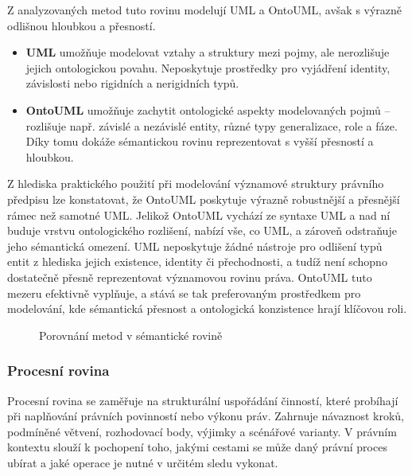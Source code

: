 Z analyzovaných metod tuto rovinu modelují UML a OntoUML, avšak s výrazně odlišnou hloubkou a přesností.

\begin{itemize}
  \item \textbf{UML} umožňuje modelovat vztahy a struktury mezi pojmy, ale nerozlišuje jejich ontologickou povahu. Neposkytuje prostředky pro vyjádření identity, závislosti nebo rigidních a nerigidních typů.

  \item \textbf{OntoUML} umožňuje zachytit ontologické aspekty modelovaných pojmů – rozlišuje např. závislé a nezávislé entity, různé typy generalizace, role a fáze. Díky tomu dokáže sémantickou rovinu reprezentovat s vyšší přesností a hloubkou.
\end{itemize}

\noindent Z hlediska praktického použití při modelování významové struktury právního předpisu lze konstatovat, že OntoUML poskytuje výrazně robustnější a přesnější rámec než samotné UML. Jelikož OntoUML vychází ze syntaxe UML a nad ní buduje vrstvu ontologického rozlišení, nabízí vše, co UML, a zároveň odstraňuje jeho sémantická omezení. UML neposkytuje žádné nástroje pro odlišení typů entit z hlediska jejich existence, identity či přechodnosti, a tudíž není schopno dostatečně přesně reprezentovat významovou rovinu práva. OntoUML tuto mezeru efektivně vyplňuje, a stává se tak preferovaným prostředkem pro modelování, kde sémantická přesnost a ontologická konzistence hrají klíčovou roli.

\begin{figure}[H]
  \centering
  \caption{Porovnání metod v sémantické rovině}
\end{figure}
  



\subsubsection{Procesní rovina}
\label{sec:procesni-rovina}
Procesní rovina se zaměřuje na strukturální uspořádání činností, které probíhají při naplňování právních povinností nebo výkonu práv. Zahrnuje návaznost kroků, podmíněné větvení, rozhodovací body, výjimky a scénářové varianty. V právním kontextu slouží k pochopení toho, jakými cestami se může daný právní proces ubírat a jaké operace je nutné v určitém sledu vykonat.

